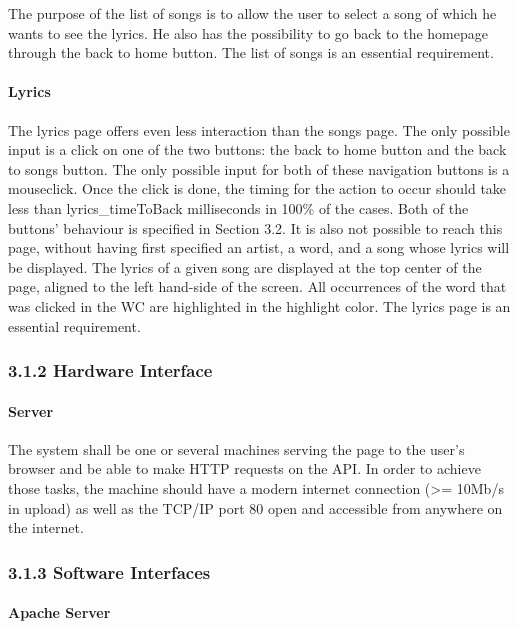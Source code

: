 \documentclass[]{article}
\begin{document}
The purpose of the list of songs is to allow the user to select a song
of which he wants to see the lyrics. He also has the possibility to go
back to the homepage through the back to home button. The list of songs
is an essential requirement.

\paragraph{Lyrics}\label{lyrics}

The lyrics page offers even less interaction than the songs page. The
only possible input is a click on one of the two buttons: the back to
home button and the back to songs button. The only possible input for
both of these navigation buttons is a mouseclick. Once the click is
done, the timing for the action to occur should take less than
lyrics\_timeToBack milliseconds in 100\% of the cases. Both of the
buttons' behaviour is specified in Section 3.2. It is also not possible
to reach this page, without having first specified an artist, a word,
and a song whose lyrics will be displayed. The lyrics of a given song
are displayed at the top center of the page, aligned to the left
hand-side of the screen. All occurrences of the word that was clicked in
the WC are highlighted in the highlight color. The lyrics page is an
essential requirement.

\subsubsection{3.1.2 Hardware Interface}\label{hardware-interface}

\paragraph{Server}\label{server}

The system shall be one or several machines serving the page to the
user's browser and be able to make HTTP requests on the API. In order to
achieve those tasks, the machine should have a modern internet
connection (\textgreater{}= 10Mb/s in upload) as well as the TCP/IP port
80 open and accessible from anywhere on the internet.

\subsubsection{3.1.3 Software Interfaces}\label{software-interfaces-1}

\paragraph{Apache Server}\label{apache-server}
\end{document}
